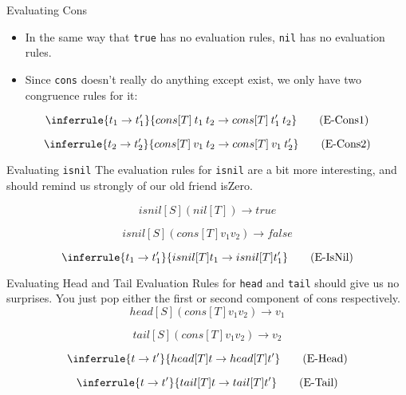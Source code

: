 \documentclass[11pt]{beamer}
\begin{document}
\begin{frame}[fragile=singleslide]{Evaluating Cons}
\begin{itemize}
\item In the same way that \texttt{true} has no evaluation rules, \texttt{nil} has no evaluation rules.
\item Since \texttt{cons} doesn't really do anything except exist, we only have two congruence rules for it:  
\end{itemize}

\begin{equation}
\inferrule{t_1 \rightarrow t_1'}{cons[T]\:t_1\:t_2 \rightarrow cons[T]\:t_1'\:t_2} \tag{E-Cons1}
\end{equation}

\begin{equation}
\inferrule{t_2 \rightarrow t_2'}{cons[T]\:v_1\:t_2 \rightarrow cons[T]\:v_1\:t_2'} \tag{E-Cons2}
\end{equation}

\end{frame}


\begin{frame}[fragile=singleslide]{Evaluating \texttt{isnil}}
The evaluation rules for \texttt{isnil} are a bit more interesting, and should remind us strongly of our old friend isZero.

\begin{equation}
isnil[S] (nil[T]) \rightarrow true \tag{E-IsNilNil}
\end{equation}

\begin{equation}
isnil[S] (cons[T] v_1 v_2) \rightarrow false \tag{E-IsNilCons}
\end{equation}

\begin{equation}
\inferrule{t_1 \rightarrow t_1'}{isnil[T] t_1 \rightarrow isnil[T] t_1'} \tag{E-IsNil}
\end{equation}

\end{frame}


\begin{frame}[fragile=singleslide]{Evaluating Head and Tail}
Evaluation Rules for \texttt{head} and \texttt{tail} should give us no surprises.  You just pop either the first or second component of cons respectively.
\begin{equation}
head[S] (cons[T] v_1 v_2) \rightarrow v_1 \tag{E-HeadCons}
\end{equation}

\begin{equation}
tail[S] (cons[T] v_1 v_2) \rightarrow v_2 \tag{E-TailCons}
\end{equation}

\begin{equation}
\inferrule{t \rightarrow t'}{head[T] t \rightarrow head[T] t'} \tag{E-Head}
\end{equation}

\begin{equation}
\inferrule{t \rightarrow t'}{tail[T] t \rightarrow tail[T] t'} \tag{E-Tail}
\end{equation}

\end{frame}
\end{document}
